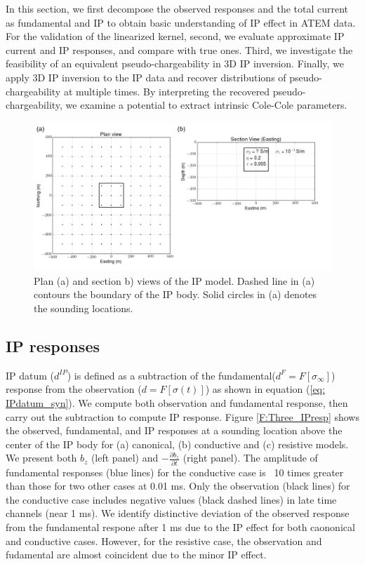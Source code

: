 \documentclass[a4paper, 11pt]{article}
\newcommand{\siginf}{\sigma_\infty}
\newcommand{\dip}{d^{IP}}
\begin{document}
In this section, we first decompose the observed responses and the total current as fundamental and IP to obtain basic understanding of IP effect in ATEM data. 
For the validation of the linearized kernel, second, we evaluate approximate IP current and IP responses, and compare with true ones. 
Third, we investigate the feasibility of an equivalent pseudo-chargeability in 3D IP inversion. 
Finally, we apply 3D IP inversion to the IP data and recover distributions of pseudo-chargeability at multiple times.  By interpreting the recovered pseudo-chargeability, we examine a potential to extract intrinsic Cole-Cole parameters. 

\begin{figure}[htb]
  \centering
  \includegraphics[width=1.0\textwidth]{figures/IPModel.png}
  \caption{Plan (a) and section b) views of the IP model. Dashed line in (a) contours the boundary of the IP body. Solid circles in (a) denotes the sounding locations.}
  \label{F: IPModel}
\end{figure}
\clearpage

\subsection{IP responses}
IP datum ($\dip$) is defined as a subtraction of the fundamental($d^{F}=F[\siginf]$) response from the observation ($d=F[\sigma(t)]$) as shown in equation (\ref{eq: IPdatum_syn}). 
We compute both observation and fundamental response, then carry out the subtraction to compute IP response. 
Figure \ref{F:Three_IPresp} shows the observed, fundamental, and IP responses at a sounding location above the center of the IP body for (a) canonical, (b) conductive and (c) resistive models.
We present both $b_z$ (left panel) and $-\frac{\partial b_z}{\partial t}$ (right panel).
The amplitude of fundamental responses (blue lines) for the conductive case is ~10 times greater than those for two other cases at 0.01 ms. 
Only the observation (black lines) for the conductive case includes negative values (black dashed lines) in late time channels (near 1 ms). 
We identify distinctive deviation of the observed response from the fundamental respone after 1 ms due to the IP effect for both caononical and conductive cases.
However, for the resistive case, the observation and fudamental are almost coincident due to the minor IP effect. 
\end{document}
